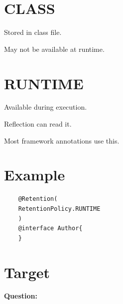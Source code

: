 \documentclass[11pt,a4paper]{book}
\begin{document}
\section{CLASS}

Stored in class file.


May not be available at runtime.


\section{RUNTIME}

Available during execution.


Reflection can read it.


Most framework annotations use this.


\section{Example}

\begin{verbatim} 
    @Retention(
    RetentionPolicy.RUNTIME
    )
    @interface Author{
    }
\end{verbatim}


\section{Target}

\textbf{Question:}

\end{document}
